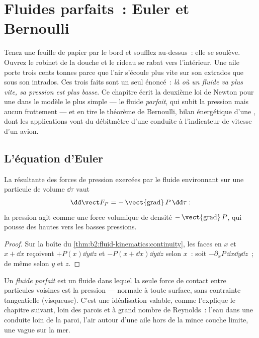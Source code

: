 \chapter{Fluides parfaits~: Euler et Bernoulli}\label{ch:b2:euler-bernoulli}

Tenez une feuille de papier par le bord et soufflez au-dessus~: elle se
soulève. Ouvrez le robinet de la douche et le rideau se rabat vers
l'intérieur. Une aile porte trois cents tonnes parce que l'air s'écoule
plus vite sur son extrados que sous son intrados. Ces trois faits sont
un seul énoncé~: \emph{là où un fluide va plus vite, sa pression est
plus basse}. Ce chapitre écrit la deuxième loi de Newton pour une
 dans le modèle le plus simple --- le fluide
\emph{parfait}, qui subit la pression mais aucun frottement --- et en
tire le théorème de Bernoulli, bilan énergétique d'une ,
dont les applications vont du débitmètre d'une conduite à
l'indicateur de vitesse d'un avion.

\section{L'équation d'Euler}

\begin{proposition}\label{prop:b2:euler-bernoulli:pressure}
La résultante des forces de pression exercées par le fluide environnant
sur une particule de volume $\dd\tau$ vaut
\[
\dd\vect F_P = -\operatorname{\vect{grad}}P\,\dd\tau :
\]
la pression agit comme une force volumique de densité $-\operatorname{\vect{grad}}P$,
qui pousse des hautes vers les basses pressions.
\end{proposition}

\begin{proof}
Sur la boîte du \cref{thm:b2:fluid-kinematics:continuity}, les faces en
$x$ et $x + \dd x$ reçoivent $+P(x)\dd y\dd z$ et $-P(x + \dd x)\dd y\dd z$
selon $x$~: soit $-\partial_xP\,\dd x\dd y\dd z$~; de même selon $y$ et $z$.
\end{proof}

\begin{definition}\label{def:b2:euler-bernoulli:perfect}
Un \emph{fluide parfait} est un fluide dans lequel la seule force de contact entre
particules voisines est la pression --- normale à toute surface, sans
contrainte tangentielle (visqueuse). C'est une idéalisation valable, comme l'explique le chapitre
suivant, loin des parois et à grand nombre de Reynolds~: l'eau dans
une conduite loin de la paroi, l'air autour d'une aile hors de la mince couche
limite, une vague sur la mer.
\end{definition}

